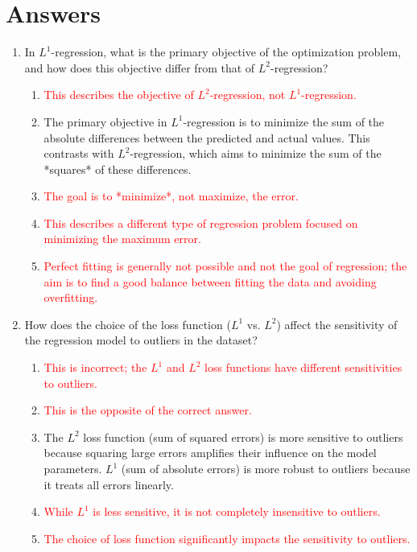 \documentclass{article}%
\newcommand{\incorrect}[1]{\textcolor{red}{#1}}
\begin{document}
%
\newpage%
\section{Answers}%
\label{sec:Answers}%
\begin{enumerate}%
\item In $L^1$-regression, what is the primary objective of the optimization problem, and how does this objective differ from that of $L^2$-regression?%
\begin{enumerate}%
\item \incorrect{This describes the objective of $L^2$-regression, not $L^1$-regression.}%
\item The primary objective in $L^1$-regression is to minimize the sum of the absolute differences between the predicted and actual values. This contrasts with $L^2$-regression, which aims to minimize the sum of the *squares* of these differences.%
\item \incorrect{The goal is to *minimize*, not maximize, the error.}%
\item \incorrect{This describes a different type of regression problem focused on minimizing the maximum error.}%
\item \incorrect{Perfect fitting is generally not possible and not the goal of regression; the aim is to find a good balance between fitting the data and avoiding overfitting.}%
\end{enumerate}%
\vspace{1em}%
\item How does the choice of the loss function ($L^1$ vs. $L^2$) affect the sensitivity of the regression model to outliers in the dataset?%
\begin{enumerate}%
\item \incorrect{This is incorrect; the $L^1$ and $L^2$ loss functions have different sensitivities to outliers.}%
\item \incorrect{This is the opposite of the correct answer.}%
\item The $L^2$ loss function (sum of squared errors) is more sensitive to outliers because squaring large errors amplifies their influence on the model parameters.  $L^1$ (sum of absolute errors) is more robust to outliers because it treats all errors linearly.%
\item \incorrect{While $L^1$ is less sensitive, it is not completely insensitive to outliers.}%
\item \incorrect{The choice of loss function significantly impacts the sensitivity to outliers.}%

\end{enumerate}
\end{enumerate}
\end{document}

